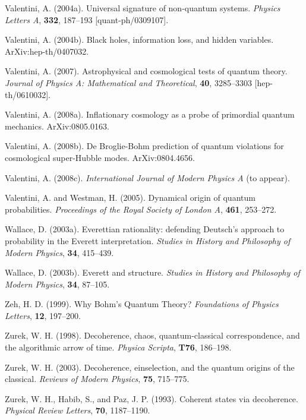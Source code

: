 \documentclass{article}%
\begin{document}
Valentini, A. (2004a). Universal signature of non-quantum systems.
\textit{Physics Letters A}, \textbf{332}, 187--193 [quant-ph/0309107].

Valentini, A. (2004b). Black holes, information loss, and hidden variables. ArXiv:hep-th/0407032.

Valentini, A. (2007). Astrophysical and cosmological tests of quantum theory.
\textit{Journal of Physics A: Mathematical and Theoretical}, \textbf{40},
3285--3303 [hep-th/0610032].

Valentini, A. (2008a). Inflationary cosmology as a probe of primordial quantum
mechanics. ArXiv:0805.0163.

Valentini, A. (2008b). De Broglie-Bohm prediction of quantum violations for
cosmological super-Hubble modes. ArXiv:0804.4656.

Valentini, A. (2008c). \textit{International Journal of Modern Physics A} (to appear).

Valentini, A. and Westman, H. (2005). Dynamical origin of quantum
probabilities. \textit{Proceedings of the Royal Society of London A},
\textbf{461}, 253--272.

Wallace, D. (2003a). Everettian rationality: defending Deutsch's approach to
probability in the Everett interpretation. \textit{Studies in History and
Philosophy of Modern Physics}, \textbf{34}, 415--439.

Wallace, D. (2003b). Everett and structure. \textit{Studies in History and
Philosophy of Modern Physics}, \textbf{34}, 87--105.

Zeh, H. D. (1999). Why Bohm's Quantum Theory? \textit{Foundations of Physics
Letters}, \textbf{12}, 197--200.

Zurek, W. H. (1998). Decoherence, chaos, quantum-classical correspondence, and
the algorithmic arrow of time. \textit{Physica Scripta}, \textbf{T76}, 186--198.

Zurek, W. H. (2003). Decoherence, einselection, and the quantum origins of the
classical. \textit{Reviews of Modern Physics}, \textbf{75}, 715--775.

Zurek, W. H., Habib, S., and Paz, J. P. (1993). Coherent states via
decoherence. \textit{Physical Review Letters}, \textbf{70}, 1187--1190.
\end{document}
